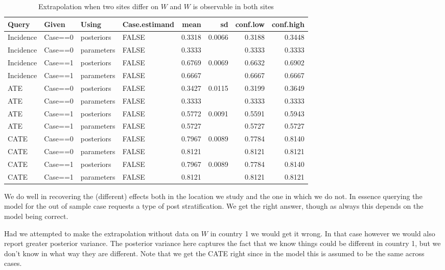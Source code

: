 \documentclass[
  12pt,
]{book}
\begin{document}
\begin{table}

\caption{\label{tab:unnamed-chunk-111}Extrapolation when two sites differ on $W$ and $W$ is observable in both sites}
\centering
\begin{tabular}[t]{l|l|l|l|r|r|r|r}
\hline
Query & Given & Using & Case.estimand & mean & sd & conf.low & conf.high\\
\hline
Incidence & Case==0 & posteriors & FALSE & 0.3318 & 0.0066 & 0.3188 & 0.3448\\
\hline
Incidence & Case==0 & parameters & FALSE & 0.3333 &  & 0.3333 & 0.3333\\
\hline
Incidence & Case==1 & posteriors & FALSE & 0.6769 & 0.0069 & 0.6632 & 0.6902\\
\hline
Incidence & Case==1 & parameters & FALSE & 0.6667 &  & 0.6667 & 0.6667\\
\hline
ATE & Case==0 & posteriors & FALSE & 0.3427 & 0.0115 & 0.3199 & 0.3649\\
\hline
ATE & Case==0 & parameters & FALSE & 0.3333 &  & 0.3333 & 0.3333\\
\hline
ATE & Case==1 & posteriors & FALSE & 0.5772 & 0.0091 & 0.5591 & 0.5943\\
\hline
ATE & Case==1 & parameters & FALSE & 0.5727 &  & 0.5727 & 0.5727\\
\hline
CATE & Case==0 & posteriors & FALSE & 0.7967 & 0.0089 & 0.7784 & 0.8140\\
\hline
CATE & Case==0 & parameters & FALSE & 0.8121 &  & 0.8121 & 0.8121\\
\hline
CATE & Case==1 & posteriors & FALSE & 0.7967 & 0.0089 & 0.7784 & 0.8140\\
\hline
CATE & Case==1 & parameters & FALSE & 0.8121 &  & 0.8121 & 0.8121\\
\hline
\end{tabular}
\end{table}

We do well in recovering the (different) effects both in the location we study and the one in which we do not. In essence querying the model for the out of sample case requests a type of post stratification. We get the right answer, though as always this depends on the model being correct.

Had we attempted to make the extrapolation without data on \(W\) in country 1 we would get it wrong. In that case however we would also report greater posterior variance. The posterior variance here captures the fact that we know things could be different in country 1, but we don't know in what way they are different. Note that we get the CATE right since in the model this is assumed to be the same across cases.
\end{document}

